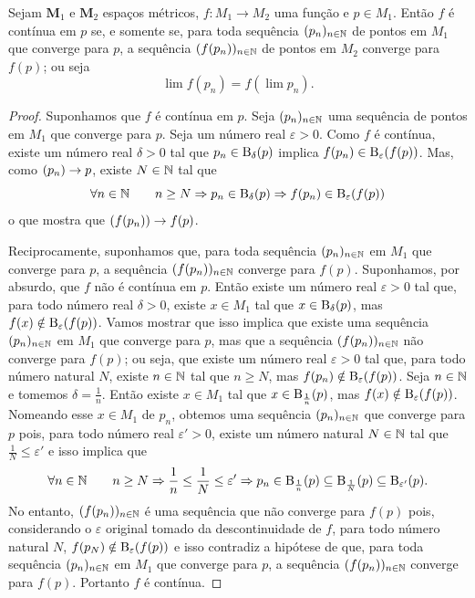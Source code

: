 \begin{prop}
Sejam $\bm M_1$ e $\bm M_2$ espaços métricos, $f: M_1 \to M_2$ uma função e $p \in M_1$. Então $f$ é contínua em $p$ se, e somente se, para toda sequência $(p_n)_{n \in \mathbb{N}}$ de pontos em $M_1$ que converge para $p$, a sequência $(f(p_n))_{n \in \mathbb{N}}$ de pontos em $M_2$ converge para $f(p)$; ou seja
	\begin{equation*}
	\lim f(p_n) = f(\lim p_n).
	\end{equation*}
\end{prop}
\begin{proof}
	Suponhamos que $f$ é contínua em $p$. Seja $(p_n)_{n \in \mathbb{N}}$ uma sequência de pontos em $M_1$ que converge para $p$. Seja um número real $\varepsilon > 0$. Como $f$ é contínua, existe um número real $\delta > 0$ tal que $p_n \in \mathrm{B}_\delta(p)$ implica $f(p_n) \in \mathrm{B}_\varepsilon(f(p))$. Mas, como $(p_n) \rightarrow p$, existe $N \in \mathbb{N}$ tal que
	\begin{equation*}
	\forall n \in \mathbb{N} \qquad n \geq N \Rightarrow p_n \in \mathrm{B}_\delta(p) \Rightarrow f(p_n) \in \mathrm{B}_\varepsilon(f(p))
	\end{equation*}
o que mostra que $(f(p_n)) \rightarrow f(p)$.
	
	Reciprocamente, suponhamos que, para toda sequência $(p_n)_{n \in \mathbb{N}}$ em $M_1$ que converge para $p$, a sequência $(f(p_n))_{n \in \mathbb{N}}$ converge para $f(p)$. Suponhamos, por absurdo, que $f$ não é contínua em $p$. Então existe um número real $\varepsilon > 0$ tal que, para todo número real $\delta > 0$, existe $x \in M_1$ tal que $x \in \mathrm{B}_\delta(p)$, mas $f(x) \notin \mathrm{B}_\varepsilon(f(p))$. Vamos mostrar que isso implica que existe uma sequência $(p_n)_{n \in \mathbb{N}}$ em $M_1$ que converge para $p$, mas que a sequência $(f(p_n))_{n \in \mathbb{N}}$ não converge para $f(p)$; ou seja, que existe um número real $\varepsilon > 0$ tal que, para todo número natural $N$, existe $n \in \mathbb{N}$ tal que $n \geq N$, mas $f(p_n) \notin \mathrm{B}_\varepsilon(f(p))$. Seja $n \in \mathbb{N}$ e tomemos $\delta = \frac{1}{n}$. Então existe $x \in M_1$ tal que $x \in \mathrm{B}_\frac{1}{n}(p)$, mas $f(x) \notin \mathrm{B}_\varepsilon(f(p))$. Nomeando esse $x \in M_1$ de $p_n$, obtemos uma sequência $(p_n)_{n \in \mathbb{N}}$ que converge para $p$ pois, para todo número real $\varepsilon' > 0$, existe um número natural $N \in \mathbb{N}$ tal que $\frac{1}{N} \leq \varepsilon'$ e isso implica que
\begin{equation*}
	\forall n \in \mathbb{N} \qquad n \geq N \Rightarrow \frac{1}{n} \leq \frac{1}{N} \leq \varepsilon' \Rightarrow p_n \in \mathrm{B}_\frac{1}{n}(p) \subseteq \mathrm{B}_\frac{1}{N}(p) \subseteq \mathrm{B}_{\varepsilon'}(p).
	\end{equation*}
	No entanto, $(f(p_n))_{n \in \mathbb{N}}$ é uma sequência que não converge para $f(p)$ pois, considerando o $\varepsilon$ original tomado da descontinuidade de $f$, para todo número natural $N$, $f(p_N) \notin \mathrm{B}_\varepsilon(f(p))$ e isso contradiz a hipótese de que, para toda sequência $(p_n)_{n \in \mathbb{N}}$ em $M_1$ que converge para $p$, a sequência $(f(p_n))_{n \in \mathbb{N}}$ converge para $f(p)$. Portanto $f$ é contínua.	
\end{proof}

